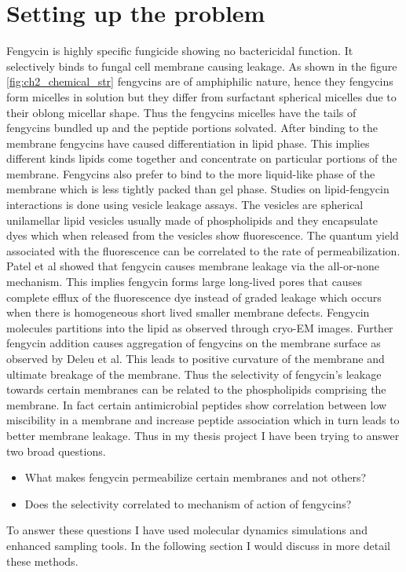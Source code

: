  \section{Setting up the problem}
Fengycin is highly specific fungicide showing no bactericidal function.\cite{Vanittanakom1986} It selectively binds to fungal cell membrane causing leakage.
As shown in the figure \ref{fig:ch2_chemical_str} fengycins are of amphiphilic nature, hence they fengycins form micelles in solution but they differ from surfactant spherical micelles due to their oblong micellar shape. Thus the fengycins micelles have the tails of fengycins bundled up and the peptide portions solvated. 
After binding to the membrane fengycins have caused differentiation in lipid phase.
This implies different kinds lipids come together and concentrate on particular portions of the membrane. \cite{Nylander2008,Deleu2013} 
Fengycins also prefer to bind to the more liquid-like phase of the membrane which is less tightly packed than gel phase.\cite{Nylander2008}
Studies on lipid-fengycin interactions is done using vesicle leakage assays. The vesicles are spherical unilamellar lipid vesicles usually made of phospholipids and they encapsulate dyes which when released from the vesicles show fluorescence. The quantum yield associated with the fluorescence can be correlated to the rate of permeabilization. \cite{Cullis1985,FiedlerHerklotz2015}
Patel et al showed that fengycin causes membrane leakage via the all-or-none mechanism.\cite{Heerklotz2011} This implies fengycin forms large long-lived pores that causes complete efflux of the fluorescence dye instead of graded leakage which occurs when there is homogeneous short lived smaller membrane defects. \cite{Marrink2008}
Fengycin molecules partitions into the lipid as observed through cryo-EM images.\cite{Heerklotz2011}
Further fengycin addition causes aggregation of fengycins on the membrane surface as observed by Deleu et al. \cite{Nylander2008}
This leads to positive curvature of the membrane and ultimate breakage of the membrane.
Thus the selectivity of fengycin's leakage towards certain membranes can be related to the phospholipids comprising the membrane. 
In fact certain antimicrobial peptides show correlation between low miscibility in a membrane and
increase peptide association which in turn leads to better membrane leakage.\cite{huang2009}
Thus in my thesis project I have been trying to answer two broad questions.
\begin{itemize}
    \item What makes fengycin permeabilize certain membranes and not others?
    \item Does the selectivity correlated to mechanism of action of fengycins?
\end{itemize}
To answer these questions I have used molecular dynamics simulations and enhanced sampling tools. In the following section I would discuss in more detail these methods.
